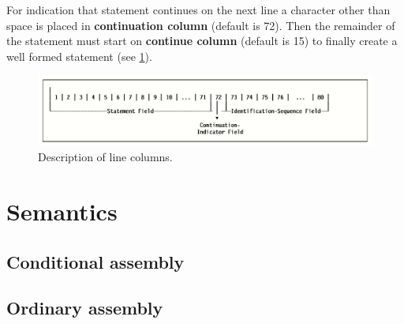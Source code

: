 For indication that statement continues on the next line a character other than space is placed in \textbf{continuation column} (default is 72). Then the remainder of the statement must start on \textbf{continue column} (default is 15) to finally create a well formed statement (see \ref{fig01:line}).

\begin{figure}\centering
	\includegraphics{img/line}
	\caption{Description of line columns.}
	\label{fig01:line}
\end{figure}


\section{Semantics}

\subsection{Conditional assembly}

\subsection{Ordinary assembly}
